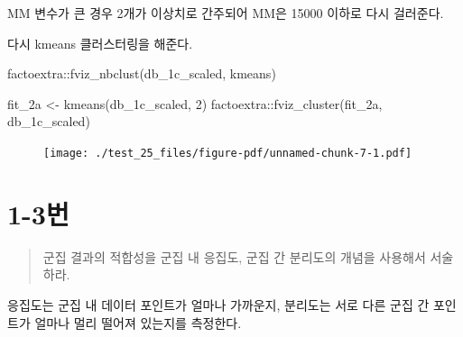 \documentclass[
  letterpaper,
  DIV=11,
  numbers=noendperiod]{scrreprt}
\newenvironment{Shaded}{\begin{snugshade}}{\end{snugshade}}
\newcommand{\CommentTok}[1]{\textcolor[rgb]{0.37,0.37,0.37}{#1}}
\newcommand{\DecValTok}[1]{\textcolor[rgb]{0.68,0.00,0.00}{#1}}
\newcommand{\FunctionTok}[1]{\textcolor[rgb]{0.28,0.35,0.67}{#1}}
\newcommand{\NormalTok}[1]{\textcolor[rgb]{0.00,0.23,0.31}{#1}}
\newcommand{\OtherTok}[1]{\textcolor[rgb]{0.00,0.23,0.31}{#1}}
\newcommand{\SpecialCharTok}[1]{\textcolor[rgb]{0.37,0.37,0.37}{#1}}
\begin{document}
MM 변수가 큰 경우 2개가 이상치로 간주되어 MM은 15000 이하로 다시
걸러준다.

다시 kmeans 클러스터링을 해준다.

\begin{Shaded}
\begin{Highlighting}[]
\NormalTok{factoextra}\SpecialCharTok{::}\FunctionTok{fviz\_nbclust}\NormalTok{(db\_1c\_scaled, kmeans)}
\end{Highlighting}
\end{Shaded}

\begin{Shaded}
\begin{Highlighting}[]
\NormalTok{fit\_2a }\OtherTok{\textless{}{-}} \FunctionTok{kmeans}\NormalTok{(db\_1c\_scaled, }\DecValTok{2}\NormalTok{)}
\NormalTok{factoextra}\SpecialCharTok{::}\FunctionTok{fviz\_cluster}\NormalTok{(fit\_2a, db\_1c\_scaled)}
\end{Highlighting}
\end{Shaded}

\begin{figure}[H]

{\centering \texttt{[image: ./test\_25\_files/figure-pdf/unnamed-chunk-7-1.pdf]}

}

\end{figure}

\hypertarget{uxbc88-41}{%
\section*{1-3번}\label{uxbc88-41}}


\begin{quote}
군집 결과의 적합성을 군집 내 응집도, 군집 간 분리도의 개념을 사용해서
서술하라.
\end{quote}

응집도는 군집 내 데이터 포인트가 얼마나 가까운지, 분리도는 서로 다른
군집 간 포인트가 얼마나 멀리 떨어져 있는지를 측정한다.

\begin{Shaded}
\end{Shaded}
\end{document}
